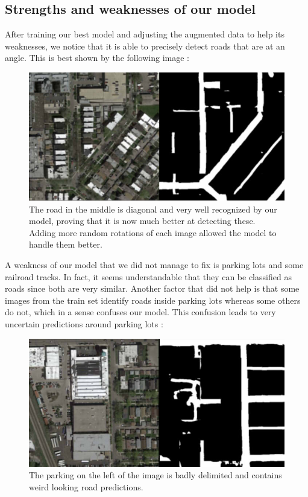 \documentclass[10pt,conference,compsocconf]{IEEEtran}
\begin{document}
\subsection{Strengths and weaknesses of our model}
After training our best model and adjusting the augmented data to help its weaknesses, we notice that it is able to precisely detect roads that are at an angle. This is best shown by the following image :
\begin{figure}[H]
    \centering
    \includegraphics[scale = 0.3]{report_images/diagonal.jpg} %
    \caption{The road in the middle is diagonal and very well recognized by our model, proving that it is now much better at detecting these. Adding more random rotations of each image allowed the model to handle them better.}
\end{figure}
A weakness of our model that we did not manage to fix is parking lots and some railroad tracks. In fact, it seems understandable that they can be classified as roads since both are very similar. Another factor that did not help is that some images from the train set identify roads inside parking lots whereas some others do not, which in a sense confuses our model. This confusion leads to very uncertain predictions around parking lots : 
\begin{figure}[H]
    \centering
    \includegraphics[scale = 0.3]{report_images/parking.jpg} %
    \caption{The parking on the left of the image is badly delimited and contains weird looking road predictions.}
\end{figure}
\end{document}
